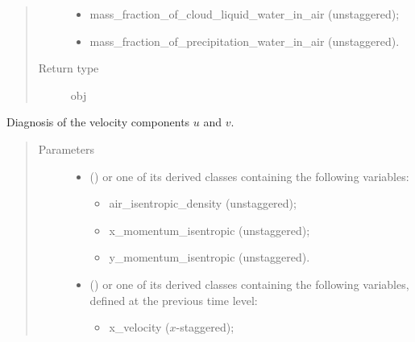 \documentclass[letterpaper,10pt,english]{sphinxmanual}
\begin{document}
\begin{fulllineitems}
\begin{fulllineitems}
\begin{quote}
\begin{description}
\begin{itemize}
\item {} 
mass\_fraction\_of\_cloud\_liquid\_water\_in\_air (unstaggered);

\item {} 
mass\_fraction\_of\_precipitation\_water\_in\_air (unstaggered).

\end{itemize}


\item[{Return type}] \leavevmode
obj

\end{description}\end{quote}

\end{fulllineitems}


\begin{fulllineitems}
\label{\detokenize{api:dycore.diagnostic_isentropic.DiagnosticIsentropic.get_velocity_components}}
Diagnosis of the velocity components \(u\) and \(v\).
\begin{quote}\begin{description}
\item[{Parameters}] \leavevmode\begin{itemize}
\item {} 
 () \textendash{} 
{\hyperref[\detokenize{api:storages.grid_data.GridData}]{}} or one of its derived classes containing the following variables:
\begin{itemize}
\item {} 
air\_isentropic\_density (unstaggered);

\item {} 
x\_momentum\_isentropic (unstaggered);

\item {} 
y\_momentum\_isentropic (unstaggered).

\end{itemize}


\item {} 
 () \textendash{} 
{\hyperref[\detokenize{api:storages.grid_data.GridData}]{}} or one of its derived classes containing the following variables,
defined at the previous time level:
\begin{itemize}
\item {} 
x\_velocity (\(x\)-staggered);


\end{itemize}
\end{itemize}
\end{description}
\end{quote}
\end{fulllineitems}
\end{fulllineitems}
\end{document}

